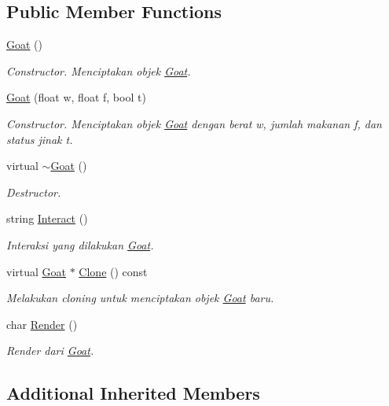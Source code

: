 \subsection*{Public Member Functions}
\begin{DoxyCompactItemize}
\item 
\hyperlink{classGoat_acf506b76c8503c9749df191a92dc99f9}{Goat} ()
\begin{DoxyCompactList}\small\item\em Constructor. Menciptakan objek \hyperlink{classGoat}{Goat}. \end{DoxyCompactList}\item 
\hyperlink{classGoat_a4b0531179ba8082e4123d1534578e226}{Goat} (float w, float f, bool t)
\begin{DoxyCompactList}\small\item\em Constructor. Menciptakan objek \hyperlink{classGoat}{Goat} dengan berat w, jumlah makanan f, dan status jinak t. \end{DoxyCompactList}\item 
virtual \hyperlink{classGoat_a47af45317eec8718356b20a10e31af27}{$\sim$\+Goat} ()
\begin{DoxyCompactList}\small\item\em Destructor. \end{DoxyCompactList}\item 
string \hyperlink{classGoat_a5f480d88c50724cee8c7a9d18f486144}{Interact} ()
\begin{DoxyCompactList}\small\item\em Interaksi yang dilakukan \hyperlink{classGoat}{Goat}. \end{DoxyCompactList}\item 
virtual \hyperlink{classGoat}{Goat} $\ast$ \hyperlink{classGoat_a1532200ef20734bb42d0a1306b14d8ad}{Clone} () const 
\begin{DoxyCompactList}\small\item\em Melakukan cloning untuk menciptakan objek \hyperlink{classGoat}{Goat} baru. \end{DoxyCompactList}\item 
char \hyperlink{classGoat_aedea4680fe17571c2f51d35b90397f6e}{Render} ()
\begin{DoxyCompactList}\small\item\em Render dari \hyperlink{classGoat}{Goat}. \end{DoxyCompactList}\end{DoxyCompactItemize}
\subsection*{Additional Inherited Members}


